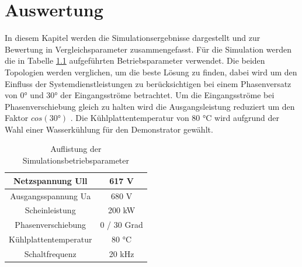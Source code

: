 \chapter{Auswertung}
In diesem Kapitel werden die Simulationsergebnisse dargestellt und zur Bewertung in Vergleichsparameter zusammengefasst. Für die Simulation werden die in Tabelle \ref{tab:Betriebspara} aufgeführten Betriebsparameter verwendet. Die beiden Topologien werden verglichen, um die beste Lösung zu finden, dabei wird um den Einfluss der Systemdienstleistungen zu berücksichtigen bei einem Phasenversatz von 0° und 30° der Eingangsströme betrachtet. Um die Eingangsströme bei Phasenverschiebung gleich zu halten wird die Ausgangsleistung reduziert um den Faktor $cos(30°)$ . Die Kühlplattentemperatur von 80 °C wird aufgrund der Wahl einer Wasserkühlung für den Demonstrator gewählt.

\begin{table}
	\centering
	\caption{Auflistung der Simulationsbetriebsparameter}
\begin{tabular}{|c|c|}
	\hline
	Netzspannung \gls{Ull} & 617 \si{\volt} \\
	\hline
	Ausgangsspannung \gls{Ua} & 680 V \\
	\hline
	Scheinleistung & 200 kW \\
	\hline
	Phasenverschiebung & 0 / 30 Grad \\
	\hline
	Kühlplattentemperatur & 80 °C \\
	\hline
	Schaltfrequenz & 20 kHz \\
	\hline
\end{tabular}

\label{tab:Betriebspara}
\end{table}



